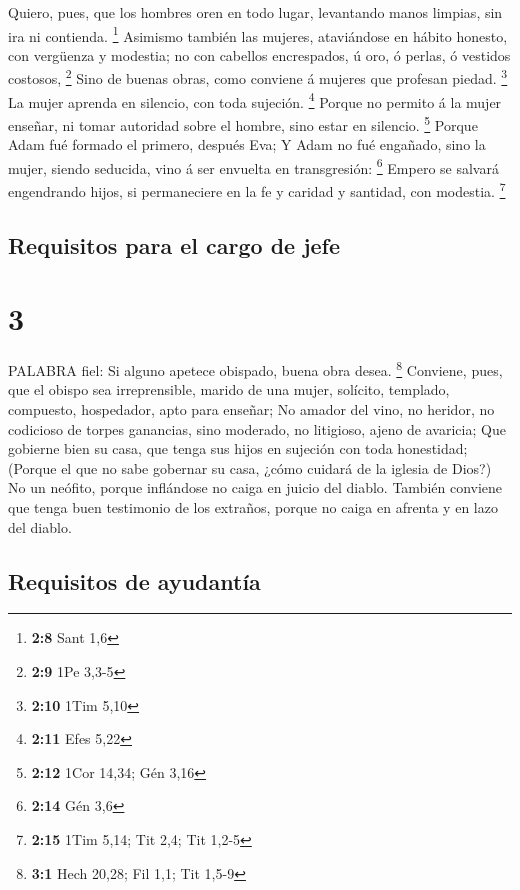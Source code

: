  Quiero, pues, que los hombres oren en todo lugar,
levantando manos limpias, sin ira ni contienda. \footnote{\textbf{2:8}
  Sant 1,6}  Asimismo también las mujeres, ataviándose en
hábito honesto, con vergüenza y modestia; no con cabellos encrespados, ú
oro, ó perlas, ó vestidos costosos, \footnote{\textbf{2:9} 1Pe 3,3-5}
 Sino de buenas obras, como conviene á mujeres que profesan
piedad. \footnote{\textbf{2:10} 1Tim 5,10}  La mujer
aprenda en silencio, con toda sujeción. \footnote{\textbf{2:11} Efes
  5,22}  Porque no permito á la mujer enseñar, ni tomar
autoridad sobre el hombre, sino estar en silencio. \footnote{\textbf{2:12}
  1Cor 14,34; Gén 3,16}  Porque Adam fué formado el
primero, después Eva;  Y Adam no fué engañado, sino la
mujer, siendo seducida, vino á ser envuelta en transgresión: \footnote{\textbf{2:14}
  Gén 3,6}  Empero se salvará engendrando hijos, si
permaneciere en la fe y caridad y santidad, con modestia. \footnote{\textbf{2:15}
  1Tim 5,14; Tit 2,4; Tit 1,2-5}

\hypertarget{requisitos-para-el-cargo-de-jefe}{%
\subsection{Requisitos para el cargo de
jefe}\label{requisitos-para-el-cargo-de-jefe}}

\hypertarget{section-2}{%
\section{3}\label{section-2}}

 PALABRA fiel: Si alguno apetece obispado, buena obra desea.
\footnote{\textbf{3:1} Hech 20,28; Fil 1,1; Tit 1,5-9} 
Conviene, pues, que el obispo sea irreprensible, marido de una mujer,
solícito, templado, compuesto, hospedador, apto para enseñar;
 No amador del vino, no heridor, no codicioso de torpes
ganancias, sino moderado, no litigioso, ajeno de avaricia; 
Que gobierne bien su casa, que tenga sus hijos en sujeción con toda
honestidad;  (Porque el que no sabe gobernar su casa, ¿cómo
cuidará de la iglesia de Dios?)  No un neófito, porque
inflándose no caiga en juicio del diablo.  También conviene
que tenga buen testimonio de los extraños, porque no caiga en afrenta y
en lazo del diablo.

\hypertarget{requisitos-de-ayudantuxeda}{%
\subsection{Requisitos de ayudantía}\label{requisitos-de-ayudantuxeda}}

